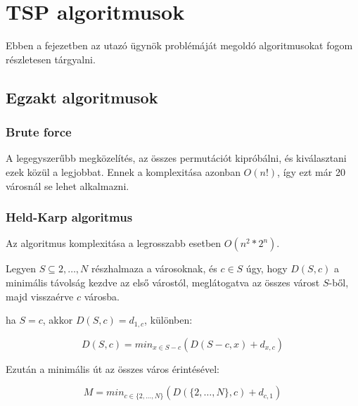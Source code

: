 \chapter{TSP algoritmusok}\label{ch:ALAP}

\begin{osszefoglal}
	Ebben a fejezetben az utazó ügynök problémáját megoldó algoritmusokat fogom részletesen tárgyalni.
	
\end{osszefoglal}

\section{Egzakt algoritmusok}\label{sec:ALAP:adatelem}

\subsection{Brute force}

A legegyszerűbb megközelítés, az összes permutációt kipróbálni, és kiválasztani ezek közül a legjobbat. Ennek a komplexitása azonban \(O(n!)\), így ezt már 20 városnál se lehet alkalmazni.


\subsection{Held-Karp algoritmus}

Az algoritmus komplexitása a legrosszabb esetben \(O(n^2*2^n)\).

Legyen \(S \subseteq {2, \dots, N}\) részhalmaza a városoknak, és \(c \in S\) úgy, hogy \(D(S,c)\) a minimális távolság kezdve az első várostól, meglátogatva az összes várost \(S\)-ből, majd visszaérve \(c\) városba.

ha \(S = {c}\), akkor \(D(S,c) = d_{1,c}\), különben:

\begin{equation}
D(S,c) = min_{x \in S-c}(D(S - c,x)+d_{x,c})
\end{equation}

Ezután a minimális út az összes város érintésével:

\begin{equation}
M = min_{c \in \{2, \dots, N\}}(D(\{2, \dots, N\}, c)+d_{c, 1})
\end{equation}

